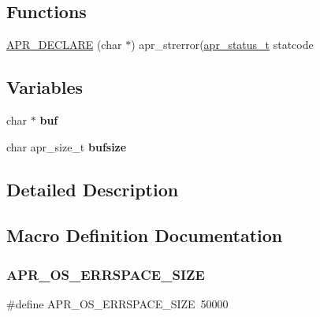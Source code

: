 \subsection*{Functions}
\begin{DoxyCompactItemize}
\item 
\mbox{\hyperlink{group__apr__errno_ga3cbf784a22bb594cd9f4911653d84696}{A\+P\+R\+\_\+\+D\+E\+C\+L\+A\+RE}} (char $\ast$) apr\+\_\+strerror(\mbox{\hyperlink{group__apr__errno_gaf76ee4543247e9fb3f3546203e590a6c}{apr\+\_\+status\+\_\+t}} statcode
\end{DoxyCompactItemize}
\subsection*{Variables}
\begin{DoxyCompactItemize}
\item 
\mbox{\label{group__apr__errno_gac14417684334d01b4e1e807a19d92816}} 
char $\ast$ {\bfseries buf}
\item 
\mbox{\label{group__apr__errno_gaacff821b2b2a35a43f6b1db27538e122}} 
char apr\+\_\+size\+\_\+t {\bfseries bufsize}
\end{DoxyCompactItemize}


\subsection{Detailed Description}


\subsection{Macro Definition Documentation}
\mbox{\label{group__apr__errno_gadb8d97e6836ccdc57b43b6119a5acccf}} 
\subsubsection{\texorpdfstring{A\+P\+R\+\_\+\+O\+S\+\_\+\+E\+R\+R\+S\+P\+A\+C\+E\+\_\+\+S\+I\+ZE}{APR\_OS\_ERRSPACE\_SIZE}}
{\footnotesize\ttfamily \#define A\+P\+R\+\_\+\+O\+S\+\_\+\+E\+R\+R\+S\+P\+A\+C\+E\+\_\+\+S\+I\+ZE~50000}

